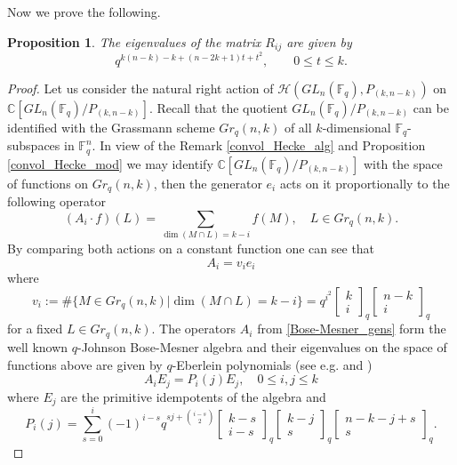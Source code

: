 \documentclass[12pt,reqno]{amsart}
\newtheorem{prop}[thm]{Proposition}
\theoremstyle{definition}
\theoremstyle{remark}
\numberwithin{equation}{section}
\newcommand{\CC}{\mathbb{C}}
\newcommand{\GL}[1]{GL_{#1}(\mathbb{F}_q)}
\begin{document}
Now we prove the following.

\begin{prop}\label{max_parabolic}
    The eigenvalues of the matrix $R_{ij}$ are given by
    \[
    q^{k(n-k)-k+(n-2k+1)t+t^2}, \qquad 0\le t \le k.
    \]
\end{prop}
\begin{proof}
    Let us consider the natural right action of $\mathcal{H}(\GL{n},P_{(k,n-k)})$ on $\CC[\GL{n}/P_{(k,n-k)}]$. Recall that the quotient $\GL{n}/P_{(k,n-k)}$ can be identified with the Grassmann scheme $Gr_q(n, k)$ of all $k$-dimensional $\mathbb{F}_q$-subspaces in $\mathbb{F}_q^n$. In view of the Remark \ref{convol_Hecke_alg} and Proposition \ref{convol_Hecke_mod} we may identify $\CC[\GL{n}/P_{(k,n-k)}]$ with the space of functions on $Gr_q(n, k)$, then the generator $e_i$ acts on it proportionally to the following operator
    \begin{equation}\label{Bose-Mesner_gens}
        (A_i \cdot f)(L)=\sum_{\dim(M\cap L)=k-i}f(M), \quad L\in Gr_q(n,k).
    \end{equation}
    By comparing both actions on a constant function one can see that
    \[
        A_i=v_i e_i
    \]
    where
    \[
    v_i :=\#\{M\in Gr_q(n,k)| \dim(M\cap L)=k-i\}=q^{i^2}\begin{bmatrix}
    k\\
    i
\end{bmatrix}_q \begin{bmatrix}
    n-k\\
    i
\end{bmatrix}_q
    \]
    for a fixed $L\in Gr_q(n,k)$. The operators $A_i$ from \eqref{Bose-Mesner_gens} form the well known $q$-Johnson Bose-Mesner algebra and their eigenvalues on the space of functions above are given by $q$-Eberlein polynomials (see e.g. \cite{LM} and \cite{W})
    \begin{equation}\label{q_Eberlein}
        A_i E_j=P_i(j)E_j, \quad 0\le i,j \le k
    \end{equation}
    where $E_j$ are the primitive idempotents of the algebra and 
    \[
    P_i(j)=\sum_{s=0}^i (-1)^{i-s}q^{sj+{i-s\choose 2}}\begin{bmatrix}
    k-s\\
    i-s
\end{bmatrix}_q \begin{bmatrix}
    k-j\\
    s
\end{bmatrix}_q \begin{bmatrix}
    n-k-j+s\\
    s
\end{bmatrix}_q.
    \]



\end{proof}
\end{document}
